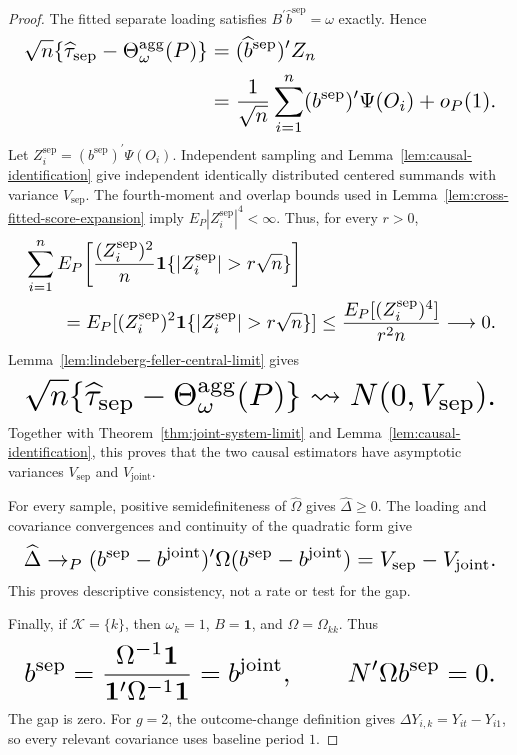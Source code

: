\documentclass{article}
\begin{document}
\begin{proof}
The fitted separate loading satisfies \(B^{\prime}\widehat b^{\mathrm{sep}}=\omega\) exactly. Hence
\[
\makebox[\linewidth][c]{\resizebox{0.98\linewidth}{!}{\(\displaystyle \begin{aligned}
 \sqrt n\{\widehat\tau_{\mathrm{sep}}-
 \Theta_\omega^{\mathrm{agg}}(P)\}
 &=(\widehat b^{\mathrm{sep}})^{\prime}Z_n\\
 &=\frac1{\sqrt n}\sum_{i=1}^n
 (b^{\mathrm{sep}})^{\prime}\Psi(O_i)+o_P(1).
\end{aligned}\)}}
\]
Let \(Z_i^{\mathrm{sep}}=(b^{\mathrm{sep}})^{\prime}\Psi(O_i)\). Independent sampling and Lemma~\ref{lem:causal-identification} give independent identically distributed centered summands with variance \(V_{\mathrm{sep}}\). The fourth-moment and overlap bounds used in Lemma~\ref{lem:cross-fitted-score-expansion} imply \(E_P|Z_i^{\mathrm{sep}}|^4<\infty\). Thus, for every \(r>0\),
\[
\makebox[\linewidth][c]{\resizebox{0.98\linewidth}{!}{\(\displaystyle \begin{aligned}
 &\sum_{i=1}^nE_P\!\left[
 \frac{(Z_i^{\mathrm{sep}})^2}{n}
 \mathbf 1\{|Z_i^{\mathrm{sep}}|>r\sqrt n\}\right]\\
 &\qquad=E_P[(Z_i^{\mathrm{sep}})^2
 \mathbf 1\{|Z_i^{\mathrm{sep}}|>r\sqrt n\}]
 \le\frac{E_P[(Z_i^{\mathrm{sep}})^4]}{r^2n}\longrightarrow0.
\end{aligned}\)}}
\]
Lemma~\ref{lem:lindeberg-feller-central-limit} gives
\[
\makebox[\linewidth][c]{\resizebox{0.98\linewidth}{!}{\(\displaystyle \sqrt n\{\widehat\tau_{\mathrm{sep}}-
 \Theta_\omega^{\mathrm{agg}}(P)\}
 \rightsquigarrow N(0,V_{\mathrm{sep}}).\)}}
\]
Together with Theorem~\ref{thm:joint-system-limit} and Lemma~\ref{lem:causal-identification}, this proves that the two causal estimators have asymptotic variances \(V_{\mathrm{sep}}\) and \(V_{\mathrm{joint}}\).

For every sample, positive semidefiniteness of \(\widehat\Omega\) gives \(\widehat\Delta\ge0\). The loading and covariance convergences and continuity of the quadratic form give
\[
\makebox[\linewidth][c]{\resizebox{0.98\linewidth}{!}{\(\displaystyle \widehat\Delta\to_P
 (b^{\mathrm{sep}}-b^{\mathrm{joint}})^{\prime}
 \Omega(b^{\mathrm{sep}}-b^{\mathrm{joint}})
 =V_{\mathrm{sep}}-V_{\mathrm{joint}}.\)}}
\]
This proves descriptive consistency, not a rate or test for the gap.

Finally, if \(\mathcal K=\{k\}\), then \(\omega_k=1\), \(B=\mathbf 1\), and \(\Omega=\Omega_{kk}\). Thus
\[
\makebox[\linewidth][c]{\resizebox{0.98\linewidth}{!}{\(\displaystyle b^{\mathrm{sep}}
 =\frac{\Omega^{-1}\mathbf 1}
 {\mathbf 1^{\prime}\Omega^{-1}\mathbf 1}
 =b^{\mathrm{joint}},
 \qquad
 N^{\prime}\Omega b^{\mathrm{sep}}=0.\)}}
\]
The gap is zero. For \(g=2\), the outcome-change definition gives \(\Delta Y_{i,k}=Y_{it}-Y_{i1}\), so every relevant covariance uses baseline period \(1\).
\end{proof}
\end{document}
